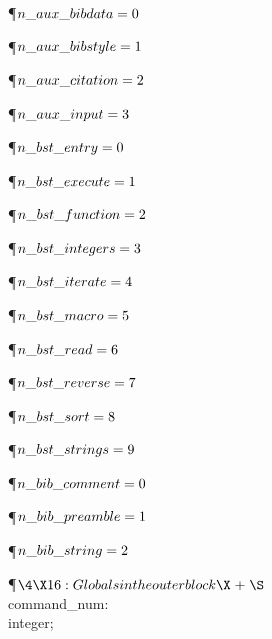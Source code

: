 \Y\P\D {}$\\{n\_aux\_bibdata}=0$\C{\.{\\bibdata}}\par
\P\D {}$\\{n\_aux\_bibstyle}=1$\C{\.{\\bibstyle}}\par
\P\D {}$\\{n\_aux\_citation}=2$\C{\.{\\citation}}\par
\P\D {}$\\{n\_aux\_input}=3$\C{\.{\\@input}}\Y\par
\P\D {}$\\{n\_bst\_entry}=0$\par
\P\D {}$\\{n\_bst\_execute}=1$\par
\P\D {}$\\{n\_bst\_function}=2$\par
\P\D {}$\\{n\_bst\_integers}=3$\par
\P\D {}$\\{n\_bst\_iterate}=4$\par
\P\D {}$\\{n\_bst\_macro}=5$\par
\P\D {}$\\{n\_bst\_read}=6$\par
\P\D {}$\\{n\_bst\_reverse}=7$\par
\P\D {}$\\{n\_bst\_sort}=8$\par
\P\D {}$\\{n\_bst\_strings}=9$\Y\par
\P\D {}$\\{n\_bib\_comment}=0$\par
\P\D {}$\\{n\_bib\_preamble}=1$\par
\P\D {}$\\{n\_bib\_string}=2$\par
\Y\P$\4\X16:Globals in the outer block\X\mathrel{+}\S$\6
\4\\{command\_num}: \\{integer};\par
\fi

